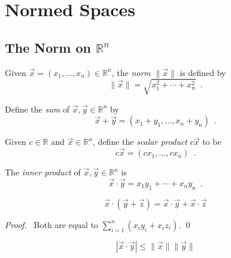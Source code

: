 \chapter{Normed Spaces}

\section{The Norm on $\mathbb{R}^n$}

\begin{df}[Norm]
  Given $\vec{x} = (x_1, \ldots, x_n) \in \mathbb{R}^n$, the \emph{norm}
  $\|\vec{x}\|$ is defined by
  \[ \|\vec{x}\| = \sqrt{x_1^2 + \cdots + x_n^2} \enspace . \]
\end{df}

\begin{df}
  Define the \emph{sum} of $\vec{x}, \vec{y} \in \mathbb{R}^n$ by
  \[ \vec{x} + \vec{y} = (x_1 + y_1, \ldots, x_n + y_n) \enspace . \]
\end{df}

\begin{df}
  Given $c \in \mathbb{R}$ and $\vec{x} \in \mathbb{R}^n$, define the
  \emph{scalar product} $c \vec{x}$ to be
  \[ c \vec{x} = (c x_1, \ldots, c x_n) \enspace . \]
\end{df}

\begin{df}
  The \emph{inner product} of $\vec{x}, \vec{y} \in \mathbb{R}^n$ is
  \[ \vec{x} \cdot \vec{y} = x_1 y_1 + \cdots + x_n y_n \enspace . \]
\end{df}

\begin{lm}
  \label{lm:norm:distribute}
  \[ \vec{x} \cdot (\vec{y} + \vec{z}) = \vec{x} \cdot \vec{y} + \vec{x}
  \cdot \vec{z} \]
\end{lm}

\begin{proof}
  \pf\ Both are equal to $\sum_{i=1}^n (x_i y_i + x_i z_i)$. \qed
\end{proof}

\begin{lm}
  \label{lm:norm:cauchy_schwarz}
  \[ |\vec{x} \cdot \vec{y}| \leq \|\vec{x}\| \|\vec{y}\| \]
\end{lm}


